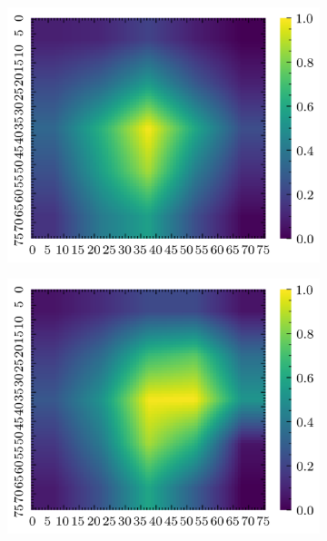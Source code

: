 \documentclass[../document.tex]{subfiles}
\begin{document}
\begin{figure}[H]
    \begin{subfigure}[b]{0.19\textwidth}
        \includegraphics[width=\linewidth]{../img/5/quarry/best/grad-cam-2d-0.png}
    \end{subfigure}
    \begin{subfigure}[b]{0.19\textwidth}
        \includegraphics[width=\linewidth]{../img/5/quarry/best/grad-cam-2d-1.png}
    \end{subfigure}  
    \begin{subfigure}[b]{0.19\textwidth}

\end{subfigure}
\end{figure}
\end{document}
